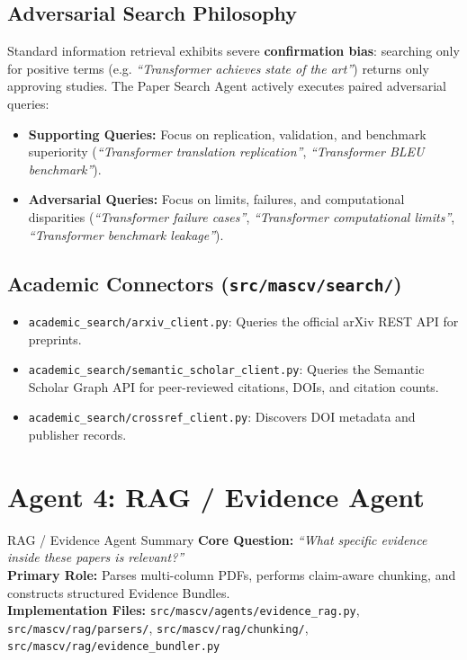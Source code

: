 \documentclass[11pt,a4paper]{article}
\begin{document}
\subsection{Adversarial Search Philosophy}
Standard information retrieval exhibits severe \textbf{confirmation bias}: searching only for positive terms (e.g. \textit{``Transformer achieves state of the art''}) returns only approving studies. The Paper Search Agent actively executes paired adversarial queries:
\begin{itemize}[leftmargin=*]
    \item \textbf{Supporting Queries:} Focus on replication, validation, and benchmark superiority (\textit{``Transformer translation replication''}, \textit{``Transformer BLEU benchmark''}).
    \item \textbf{Adversarial Queries:} Focus on limits, failures, and computational disparities (\textit{``Transformer failure cases''}, \textit{``Transformer computational limits''}, \textit{``Transformer benchmark leakage''}).
\end{itemize}

\subsection{Academic Connectors (\texttt{src/mascv/search/})}
\begin{itemize}[leftmargin=*]
    \item \texttt{academic\_search/arxiv\_client.py}: Queries the official arXiv REST API for preprints.
    \item \texttt{academic\_search/semantic\_scholar\_client.py}: Queries the Semantic Scholar Graph API for peer-reviewed citations, DOIs, and citation counts.
    \item \texttt{academic\_search/crossref\_client.py}: Discovers DOI metadata and publisher records.
\end{itemize}

\section{Agent 4: RAG / Evidence Agent}

\begin{agentbox}{RAG / Evidence Agent Summary}
\textbf{Core Question:} \textit{``What specific evidence inside these papers is relevant?''}\\
\textbf{Primary Role:} Parses multi-column PDFs, performs claim-aware chunking, and constructs structured Evidence Bundles.\\
\textbf{Implementation Files:} \texttt{src/mascv/agents/evidence\_rag.py}, \texttt{src/mascv/rag/parsers/}, \texttt{src/mascv/rag/chunking/}, \texttt{src/mascv/rag/evidence\_bundler.py}
\end{agentbox}
\end{document}
